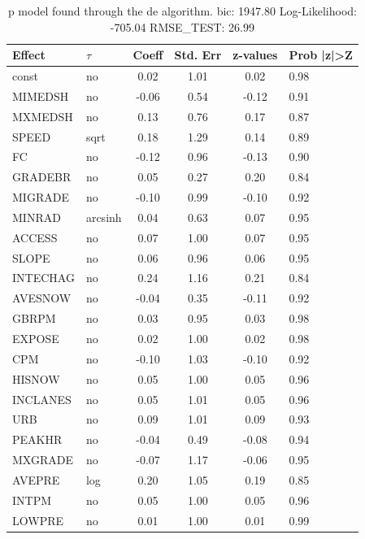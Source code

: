 \begin{table}
	\caption{p model found through the de algorithm. bic: 1947.80 Log-Likelihood: -705.04 RMSE_TEST: 26.99}
	\begin{center}
		\begin{tabular}{|l|l|c|c|c|l|}
			\hline
			Effect & $\tau$ & Coeff & Std. Err & z-values & Prob |z|>Z \\
			\hline
			const & no & 0.02 & 1.01 & 0.02 & 0.98 \\
			\hline
			MIMEDSH & no & -0.06 & 0.54 & -0.12 & 0.91 \\
			\hline
			MXMEDSH & no & 0.13 & 0.76 & 0.17 & 0.87 \\
			\hline
			SPEED & sqrt & 0.18 & 1.29 & 0.14 & 0.89 \\
			\hline
			FC & no & -0.12 & 0.96 & -0.13 & 0.90 \\
			\hline
			GRADEBR & no & 0.05 & 0.27 & 0.20 & 0.84 \\
			\hline
			MIGRADE & no & -0.10 & 0.99 & -0.10 & 0.92 \\
			\hline
			MINRAD & arcsinh & 0.04 & 0.63 & 0.07 & 0.95 \\
			\hline
			ACCESS & no & 0.07 & 1.00 & 0.07 & 0.95 \\
			\hline
			SLOPE & no & 0.06 & 0.96 & 0.06 & 0.95 \\
			\hline
			INTECHAG & no & 0.24 & 1.16 & 0.21 & 0.84 \\
			\hline
			AVESNOW & no & -0.04 & 0.35 & -0.11 & 0.92 \\
			\hline
			GBRPM & no & 0.03 & 0.95 & 0.03 & 0.98 \\
			\hline
			EXPOSE & no & 0.02 & 1.00 & 0.02 & 0.98 \\
			\hline
			CPM & no & -0.10 & 1.03 & -0.10 & 0.92 \\
			\hline
			HISNOW & no & 0.05 & 1.00 & 0.05 & 0.96 \\
			\hline
			INCLANES & no & 0.05 & 1.01 & 0.05 & 0.96 \\
			\hline
			URB & no & 0.09 & 1.01 & 0.09 & 0.93 \\
			\hline
			PEAKHR & no & -0.04 & 0.49 & -0.08 & 0.94 \\
			\hline
			MXGRADE & no & -0.07 & 1.17 & -0.06 & 0.95 \\
			\hline
			AVEPRE & log & 0.20 & 1.05 & 0.19 & 0.85 \\
			\hline
			INTPM & no & 0.05 & 1.00 & 0.05 & 0.96 \\
			\hline
			LOWPRE & no & 0.01 & 1.00 & 0.01 & 0.99 \\

\end{tabular}
\end{center}
\end{table}

